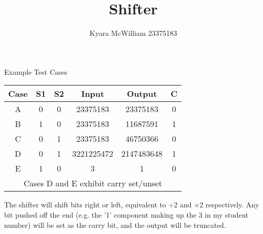 \documentclass{article}
\title{Shifter}
\author{Kyara McWilliam 23375183}
\date{}
\begin{document}
\maketitle

Example Test Cases
\hfill \break

\begin{tabular}{ |c|c|c|c|c|c| }
\hline
Case & S1 & S2 & Input & Output & C \\
\hline
A & 0 & 0 & 23375183 & 23375183 & 0 \\
B & 1 & 0 & 23375183 & 11687591 & 1 \\
C & 0 & 1 & 23375183 & 46750366 & 0 \\
D & 0 & 1 & 3221225472 & 2147483648 & 1 \\
E & 1 & 0 & 3 & 1 & 0 \\
\hline
\multicolumn{6}{|c|}{Cases D and E exhibit carry set/unset}\\
\hline
\end{tabular}
\hfill \break \break
The shifter will shift bits right or left, equivalent to $\div$2 and $\times$2 respectively. Any bit pushed off the end (e.g. the '1' component making up the 3 in my student number) will be set as the carry bit, and the output will be truncated.
\end{document}

